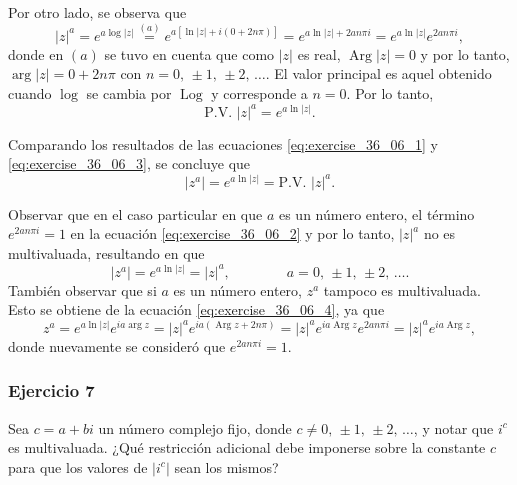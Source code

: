 \documentclass[a4paper]{report}
\DeclareMathOperator{\Arg}{Arg}
\DeclareMathOperator{\Log}{Log}
\begin{document}
Por otro lado, se observa que 
\begin{equation}\label{eq:exercise_36_06_2}
 |z|^a=e^{a\log|z|}\overset{(a)}{=}e^{a[\ln|z|+i(0+2n\pi)]}=e^{a\ln|z|+2an\pi i}=e^{a\ln|z|}e^{2an\pi i}, 
\end{equation}
donde en \((a)\) se tuvo en cuenta que como \(|z|\) es real, \(\Arg|z|=0\) y por lo tanto, \(\arg|z|=0+2n\pi\) con \(n=0,\,\pm1,\,\pm2,\,\dots\). El valor principal es aquel obtenido cuando \(\log\) se cambia por \(\Log\) y corresponde a \(n=0\). Por lo tanto, 
\begin{equation}\label{eq:exercise_36_06_3}
 \textrm{P.V. }|z|^a=e^{a\ln|z|}. 
\end{equation}

Comparando los resultados de las ecuaciones \ref{eq:exercise_36_06_1} y \ref{eq:exercise_36_06_3}, se concluye que 
\[
 |z^a|=e^{a\ln|z|}=\textrm{P.V. }|z|^a.
\]

Observar que en el caso particular en que \(a\) es un número entero, el término \(e^{2an\pi i}=1\) en la ecuación \ref{eq:exercise_36_06_2} y por lo tanto, \(|z|^a\) no es multivaluada, resultando en que
\[
 |z^a|=e^{a\ln|z|}=|z|^a,
 \qquad\qquad a=0,\,\pm1,\,\pm2,\,\dots.
\]
También observar que si \(a\) es un número entero, \(z^a\) tampoco es multivaluada. Esto se obtiene de la ecuación \ref{eq:exercise_36_06_4}, ya que
\[
 z^a=e^{a\ln|z|}e^{ia\arg z}=|z|^ae^{ia(\Arg z+2n\pi)}=|z|^ae^{ia\Arg z}e^{2an\pi i}=|z|^ae^{ia\Arg z},
\]
donde nuevamente se consideró que \(e^{2an\pi i}=1\).

\subsubsection{Ejercicio 7}

Sea \(c=a+bi\) un número complejo fijo, donde \(c\neq0,\,\pm1,\,\pm2,\,\dots\), y notar que \(i^c\) es multivaluada. ¿Qué restricción adicional debe imponerse sobre la constante \(c\) para que los valores de \(|i^c|\) sean los mismos?
\end{document}
